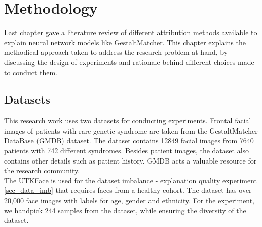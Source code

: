 \documentclass[../report.tex]{subfiles}
\begin{document}
    \chapter{Methodology}
	Last chapter gave a literature review of different attribution methods available to explain neural network models like GestaltMatcher. This chapter explains the methodical approach taken to address the research problem at hand, by discussing the design of experiments and rationale behind different choices made to conduct them. 
	\section{Datasets}
	This research work uses two datasets for conducting experiments. Frontal facial images of patients with rare genetic syndrome are taken from the GestaltMatcher DataBase (GMDB) dataset. The dataset contains 12849 facial images from 7640 patients with 742 different syndromes. Besides patient images, the dataset also contains other details such as patient history. GMDB acts a valuable resource for the research community.\\
	The UTKFace \cite{zhifei2017cvpr} is used for the dataset imbalance - explanation quality experiment   \ref{sec_data_imb} that requires faces from a healthy cohort. The dataset has over 20,000 face images with labels for age, gender and ethnicity. For the experiment, we handpick 244 samples from the dataset, while ensuring the diversity of the dataset.
	      
\end{document}
